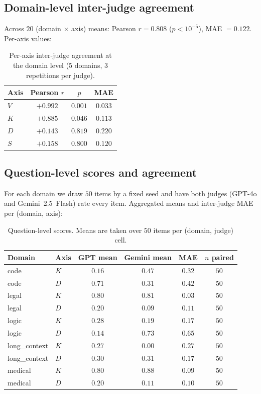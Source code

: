 \documentclass{article}
\begin{document}
\subsection{Domain-level inter-judge agreement}

Across $20$ (domain $\times$ axis) means: Pearson $r=0.808$ ($p<10^{-5}$), MAE $=0.122$. Per-axis values:

\begin{table}[h]
\centering
\caption{Per-axis inter-judge agreement at the domain level (5 domains, 3 repetitions per judge).}
\label{tab:agree-domain}
\begin{tabular}{lccc}
\toprule
\textbf{Axis} & \textbf{Pearson $r$} & $p$ & \textbf{MAE} \\
\midrule
$V$ & $+0.992$ & $0.001$ & $0.033$ \\
$K$ & $+0.885$ & $0.046$ & $0.113$ \\
$D$ & $+0.143$ & $0.819$ & $0.220$ \\
$S$ & $+0.158$ & $0.800$ & $0.120$ \\
\bottomrule
\end{tabular}
\end{table}

\subsection{Question-level scores and agreement}

For each domain we draw $50$ items by a fixed seed and have both judges (GPT-4o and Gemini~2.5~Flash) rate every item. Aggregated means and inter-judge MAE per (domain, axis):

\begin{table}[h]
\centering
\caption{Question-level scores. Means are taken over $50$ items per (domain, judge) cell.}
\label{tab:qlevel}
\begin{tabular}{ll cccc}
\toprule
\textbf{Domain} & \textbf{Axis} & \textbf{GPT mean} & \textbf{Gemini mean} & \textbf{MAE} & \textbf{$n$ paired} \\
\midrule
code         & $K$ & $0.16$ & $0.47$ & $0.32$ & $50$ \\
code         & $D$ & $0.71$ & $0.31$ & $0.42$ & $50$ \\
legal        & $K$ & $0.80$ & $0.81$ & $0.03$ & $50$ \\
legal        & $D$ & $0.20$ & $0.09$ & $0.11$ & $50$ \\
logic        & $K$ & $0.28$ & $0.19$ & $0.17$ & $50$ \\
logic        & $D$ & $0.14$ & $0.73$ & $0.65$ & $50$ \\
long\_context & $K$ & $0.27$ & $0.00$ & $0.27$ & $50$ \\
long\_context & $D$ & $0.30$ & $0.31$ & $0.17$ & $50$ \\
medical      & $K$ & $0.80$ & $0.88$ & $0.09$ & $50$ \\
medical      & $D$ & $0.20$ & $0.11$ & $0.10$ & $50$ \\
\bottomrule
\end{tabular}
\end{table}
\end{document}
